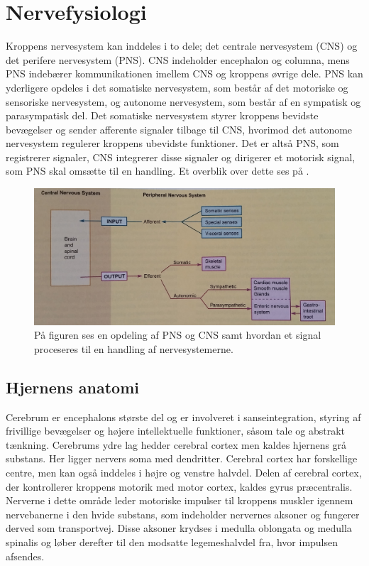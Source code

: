 \chapter{Nervefysiologi}\label{AppNerve}
Kroppens nervesystem kan inddeles i to dele; det centrale nervesystem (CNS) og det perifere nervesystem (PNS). CNS indeholder encephalon og columna, mens PNS indebærer kommunikationen imellem CNS og kroppens øvrige dele. PNS kan yderligere opdeles i det somatiske nervesystem, som består af det motoriske og sensoriske nervesystem, og autonome nervesystem, som består af en sympatisk og parasympatisk del. Det somatiske nervesystem styrer kroppens bevidste bevægelser og sender afferente signaler tilbage til CNS, hvorimod det autonome nervesystem regulerer kroppens ubevidste funktioner. Det er altså PNS, som registrerer signaler, CNS integrerer disse signaler og dirigerer et motorisk signal, som PNS skal omsætte til en handling. \cite{Martini2012,Stanfield2014} Et overblik over dette ses på .

\begin{figure}[H]
	\centering
	\includegraphics[scale=0.15]{figures/bProblemanalyse/Nervesys1.jpg}
	\caption{På figuren ses en opdeling af PNS og CNS samt hvordan et signal proceseres til en handling af nervesystemerne. \cite{Stanfield2014}}
	\label{Nersys}
\end{figure}

\section{Hjernens anatomi}
Cerebrum er encephalons største del og er involveret i sanseintegration, styring af frivillige bevægelser og højere intellektuelle funktioner, såsom tale og abstrakt tænkning. \cite{Academic2015b} Cerebrums ydre lag hedder cerebral cortex men kaldes hjernens grå substans. Her ligger nervers soma med dendritter. Cerebral cortex har forskellige centre, men kan også inddeles i højre og venstre halvdel. Delen af cerebral cortex, der kontrollerer kroppens motorik med motor cortex, kaldes gyrus præcentralis. Nerverne i dette område leder motoriske impulser til kroppens muskler igennem nervebanerne i den hvide substans, som indeholder nervernes aksoner og fungerer derved som transportvej. \cite{Academic2015b,Martini2012,Stanfield2014} Disse aksoner krydses i medulla oblongata og medulla spinalis og løber derefter til den modsatte legemeshalvdel fra, hvor impulsen afsendes. \cite{Martini2012}

